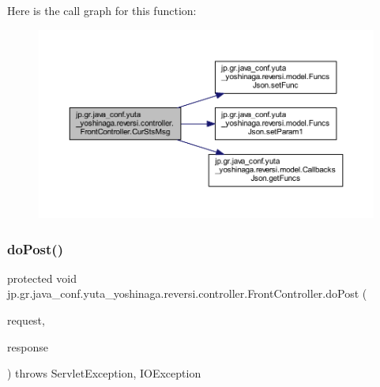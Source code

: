 Here is the call graph for this function\+:
\nopagebreak
\begin{figure}[H]
\begin{center}
\leavevmode
\includegraphics[width=350pt]{classjp_1_1gr_1_1java__conf_1_1yuta__yoshinaga_1_1reversi_1_1controller_1_1_front_controller_a49315230e704778721afb73c59e14d88_cgraph}
\end{center}
\end{figure}
\mbox{\label{classjp_1_1gr_1_1java__conf_1_1yuta__yoshinaga_1_1reversi_1_1controller_1_1_front_controller_a2f0d63da6e6fc17d2ecf2695af6f8d99}} 
\subsubsection{\texorpdfstring{do\+Post()}{doPost()}}
{\footnotesize\ttfamily protected void jp.\+gr.\+java\+\_\+conf.\+yuta\+\_\+yoshinaga.\+reversi.\+controller.\+Front\+Controller.\+do\+Post (\begin{DoxyParamCaption}\item[{Http\+Servlet\+Request}]{request,  }\item[{Http\+Servlet\+Response}]{response }\end{DoxyParamCaption}) throws Servlet\+Exception, I\+O\+Exception\hspace{0.3cm}{\ttfamily [protected]}}



